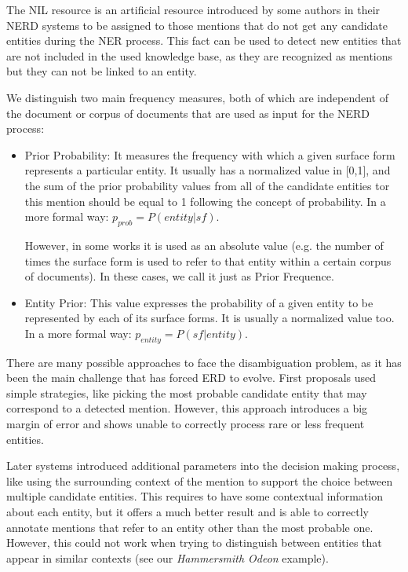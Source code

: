 \begin{defi}
The NIL resource is an artificial resource introduced by some authors in their NERD systems to be assigned to those mentions that do not get any candidate entities during the NER process. This fact can be used to detect new entities that are not included in the used knowledge base, as they are recognized as mentions but they can not be linked to an entity.
\end{defi}

\begin{defi}
We distinguish two main frequency measures, both of which are independent of the document or corpus of documents that are used as input for the NERD process:
%
\begin{itemize}
\item Prior Probability: It measures the frequency with which a given surface form represents a particular entity. It usually has a normalized value in [0,1], and the sum of the prior probability values from all of the candidate entities tor this mention should be equal to 1 following the concept of probability. In a more formal way: $p_{prob} = P(entity|sf)$.

However, in some works it is used as an absolute value (e.g. the number of times the surface form is used to refer to that entity within a certain corpus of documents). In these cases, we call it just as Prior Frequence.

\item Entity Prior: This value expresses the probability of a given entity to be represented by each of its surface forms. It is usually a normalized value too. In a more formal way: $p_{entity} = P(sf|entity)$.
\end{itemize}
\end{defi}

There are many possible approaches to face the disambiguation problem, as it has been the main challenge that has forced ERD to evolve. First proposals used simple strategies, like picking the most probable candidate entity that may correspond to a detected mention. However, this approach introduces a big margin of error and shows unable to correctly process rare or less frequent entities.

Later systems introduced additional parameters into the decision making process, like using the surrounding context of the mention to support the choice between multiple candidate entities. This requires to have some contextual information about each entity, but it offers a much better result and is able to correctly annotate mentions that refer to an entity other than the most probable one. However, this could not work when trying to distinguish between entities that appear in similar contexts (see our \emph{Hammersmith Odeon} example).

